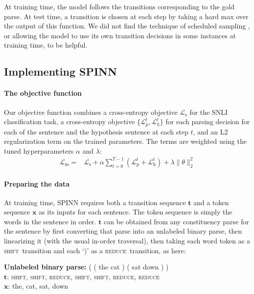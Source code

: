 \documentclass[11pt]{article}
\newcommand{\shift}{\textsc{shift}}
\newcommand{\reduce}{\textsc{reduce}}
\begin{document}
At training time, the model follows the transitions corresponding to the gold parse. At test time, a transition is chosen at each step by taking a hard max over the output of this function. We did not find the technique of scheduled sampling \citep{bengio2015scheduled}, or allowing the model to use its own transition decisions in some instances at training time, to be helpful.

\subsection{Implementing SPINN}

\paragraph{The objective function} Our objective function combines a cross-entropy objective $\mathcal{L}_{\text{s}}$ for the SNLI classification task, a cross-entropy objective $\{\mathcal{L}_p^t, \mathcal{L}_h^t\}$ for each parsing decision for each of the sentence and the hypothesis sentence at each step $t$, and an L2 regularization term on the trained parameters. The terms are weighted using the tuned hyperparameters $\alpha$ and $\lambda$:
\begin{equation}
\begin{split}
\mathcal{L}_{\text{m}} = &\mathcal{L}_{\text{s}} + \alpha \sum_{t=0}^{T-1} (\mathcal{L}_{\text{p}}^{t} + \mathcal{L}_{\text{h}}^{t}) + \lambda \|\theta\|^2_2
\end{split}
\end{equation}
\paragraph{Preparing the data} At training time, SPINN requires both a transition sequence $\mathbf t$  and a token sequence $\mathbf x$ as its inputs for each sentence. The token sequence is simply the words in the sentence in order. $\mathbf t$ can be obtained from any constituency parse for the sentence by first converting that parse into an unlabeled binary parse, then linearizing it (with the usual in-order traversal), then taking each word token as a \shift~transition and each `)' as a \reduce~transition, as here:

\vspace{0.5em}
{\noindent\small
{\bf Unlabeled binary parse:} ( ( the cat ) ( sat down ) )\\
{$\mathbf t$}: \shift, \shift, \reduce, \shift, \shift, \reduce, \reduce\\
{$\mathbf x$}: the, cat, sat, down
}
\end{document}
